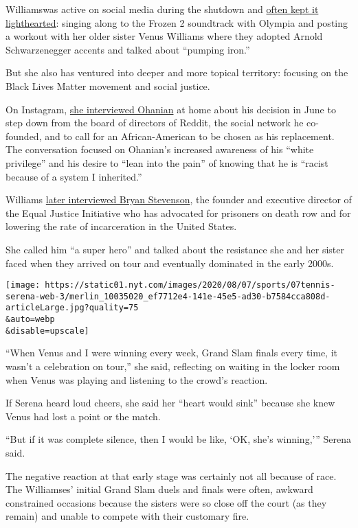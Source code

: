 Williamswas active on social media during the shutdown and
\href{https://www.instagram.com/p/CDkFg76HjNX/}{often kept it
lighthearted}: singing along to the Frozen 2 soundtrack with Olympia and
posting a workout with her older sister Venus Williams where they
adopted Arnold Schwarzenegger accents and talked about ``pumping iron.''

But she also has ventured into deeper and more topical territory:
focusing on the Black Lives Matter movement and social justice.

On Instagram, \href{https://www.instagram.com/tv/CBHFg2fH-Uz/?hl=en}{she
interviewed Ohanian} at home about his decision in June to step down
from the board of directors of Reddit, the social network he co-founded,
and to call for an African-American to be chosen as his replacement. The
conversation focused on Ohanian's increased awareness of his ``white
privilege'' and his desire to ``lean into the pain'' of knowing that he
is ``racist because of a system I inherited.''

Williams \href{https://www.instagram.com/tv/CBuFfWIq4Q0/?hl=en}{later
interviewed Bryan Stevenson}, the founder and executive director of the
Equal Justice Initiative who has advocated for prisoners on death row
and for lowering the rate of incarceration in the United States.

She called him ``a super hero'' and talked about the resistance she and
her sister faced when they arrived on tour and eventually dominated in
the early 2000s.

\texttt{[image: https://static01.nyt.com/images/2020/08/07/sports/07tennis-serena-web-3/merlin\_10035020\_ef7712e4-141e-45e5-ad30-b7584cca808d-articleLarge.jpg?quality=75\\\&auto=webp\\\&disable=upscale]}

``When Venus and I were winning every week, Grand Slam finals every
time, it wasn't a celebration on tour,'' she said, reflecting on waiting
in the locker room when Venus was playing and listening to the crowd's
reaction.

If Serena heard loud cheers, she said her ``heart would sink'' because
she knew Venus had lost a point or the match.

``But if it was complete silence, then I would be like, `OK, she's
winning,''' Serena said.

The negative reaction at that early stage was certainly not all because
of race. The Williamses' initial Grand Slam duels and finals were often,
awkward constrained occasions because the sisters were so close off the
court (as they remain) and unable to compete with their customary fire.

